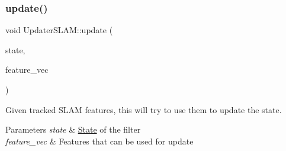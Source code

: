 \subsubsection{\texorpdfstring{update()}{update()}}
{\footnotesize\ttfamily void Updater\+S\+L\+A\+M\+::update (\begin{DoxyParamCaption}\item[{std\+::shared\+\_\+ptr$<$ \hyperlink{classov__msckf_1_1State}{State} $>$}]{state,  }\item[{std\+::vector$<$ std\+::shared\+\_\+ptr$<$ \hyperlink{classov__core_1_1Feature}{ov\+\_\+core\+::\+Feature} $>$$>$ \&}]{feature\+\_\+vec }\end{DoxyParamCaption})}



Given tracked S\+L\+AM features, this will try to use them to update the state. 


\begin{DoxyParams}{Parameters}
{\em state} & \hyperlink{classov__msckf_1_1State}{State} of the filter \\
\hline
{\em feature\+\_\+vec} & Features that can be used for update \\
\hline
\end{DoxyParams}
